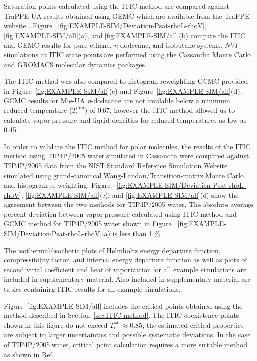 \documentclass[5p,times]{elsarticle}
\begin{document}
Saturation points calculated using the ITIC method are compared against TraPPE-UA results obtained using GEMC which are available from the TraPPE website \cite{eggimann2014}. Figure~ \ref{fig:EXAMPLE-SIM/Deviation-Psat-rhoL-rhoV}, \ref{fig:EXAMPLE-SIM/all}(a), and \ref{fig:EXAMPLE-SIM/all}(b) compare the ITIC and GEMC results for pure ethane, \textit{n}-dodecane, and isobutane systems. $NVT$ simulations at ITIC state points are performed using the Cassandra Monte Carlo \cite{Shah2017} and GROMACS molecular dynamics \cite{Lindahl2001} packages. 

The ITIC method was also compared to histogram-reweighting GCMC provided in Figure~\ref{fig:EXAMPLE-SIM/all}(c) and Figure~\ref{fig:EXAMPLE-SIM/all}(d). GCMC results for Mie-UA \textit{n}-dodecane are not available below a minimum reduced temperature ($T_\mathrm{r}^{\mathrm{min}}$) of 0.67, however the ITIC method allowed us to calculate vapor pressure and liquid densities for reduced temperatures as low as 0.45. 

In order to validate the ITIC method for polar molecules, the results of the ITIC method using TIP4P/2005 water simulated in Cassandra were compared against TIP4P/2005 data from the NIST Standard Reference Simulation Website \cite{Shen2008} simulated using grand-canonical Wang-Landau/Transition-matrix Monte Carlo and histogram re-weighting. Figure~ \ref{fig:EXAMPLE-SIM/Deviation-Psat-rhoL-rhoV}, \ref{fig:EXAMPLE-SIM/all}(c), and \ref{fig:EXAMPLE-SIM/all}(d) show the agreement between the two methods for TIP4P/2005 water. The absolute average percent deviation between vapor pressure calculated using ITIC method and GCMC method for TIP4P/2005 water shown in Figure~ \ref{fig:EXAMPLE-SIM/Deviation-Psat-rhoL-rhoV}(a) is less than 1 \%.

 The isothermal/isochoric plots of Helmholtz energy departure function, compressibility factor, and internal energy departure function as well as plots of second virial coefficient and heat of vaporization for all example simulations are included in supplementary material. Also included in supplementary material are tables containing ITIC results for all example simulations.

Figure~\ref{fig:EXAMPLE-SIM/all} includes the critical points obtained using the method described in Section~\ref{sec:ITIC-method}. The ITIC coexistence points 
shown in this figure do not exceed $T_\mathrm{r}^\mathrm{sat} \approx 0.85$, the estimated critical properties are subject to larger uncertainties and possible systematic deviations. In the case of TIP4P/2005 water, critical point calculation requires a more suitable method as shown in Ref.~\cite{Vega2006}.
\end{document}
